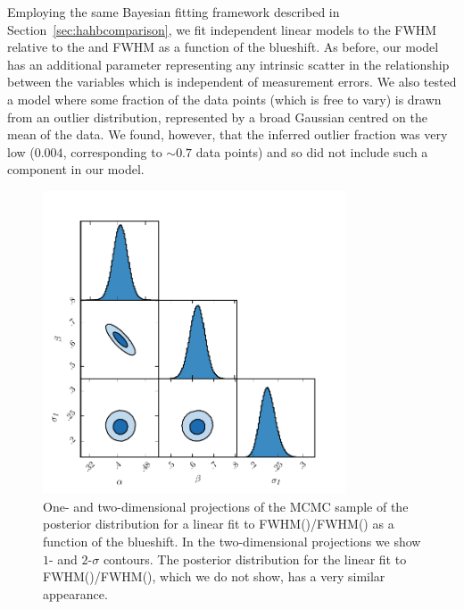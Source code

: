 Employing the same Bayesian fitting framework described in Section~\ref{sec:hahbcomparison}, we fit independent linear models to the  FWHM relative to the \ha and \hb FWHM as a function of the  blueshift. 
As before, our model has an additional parameter representing any intrinsic scatter in the relationship between the variables which is independent of measurement errors.  
We also tested a model where some fraction of the data points (which is free to vary) is drawn from an outlier distribution, represented by a broad Gaussian centred on the mean of the data. 
We found, however, that the inferred outlier fraction was very low ($0.004$, corresponding to $\sim0.7$ data points) and so did not include such a component in our model. 

\begin{figure}
    \centering
    \includegraphics[width=0.8\textwidth]{figures/chapter03/civ_ha_mcmc_parameters.pdf} 
    \caption[{Projections of the MCMC sample of the posterior distribution for a linear fit to FWHM()/FWHM(\hans) as a function of the  blueshift.}]{One- and two-dimensional projections of the MCMC sample of the posterior distribution for a linear fit to FWHM()/FWHM(\hans) as a function of the  blueshift. In the two-dimensional projections we show $1$- and $2$-$\sigma$ contours. The posterior distribution for the linear fit to FWHM()/FWHM(\hbns), which we do not show, has a very similar appearance.} 
    \label{fig:mcmc_parameters}
\end{figure}


